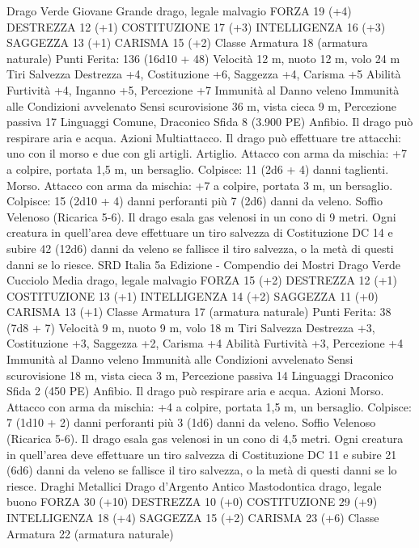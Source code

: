 \begin{multicols}{2}
Drago Verde Giovane
Grande drago, legale malvagio
FORZA 19 (+4)
DESTREZZA 12 (+1)
COSTITUZIONE 17 (+3)
INTELLIGENZA 16 (+3)
SAGGEZZA 13 (+1)
CARISMA 15 (+2)
Classe Armatura 18 (armatura naturale)
\hspace*{0pt}\hfill{Punti Ferita}: 136 (16d10 + 48)
Velocità 12 m, nuoto 12 m, volo 24 m
Tiri Salvezza Destrezza +4, Costituzione +6, Saggezza +4, Carisma +5
Abilità Furtività +4, Inganno +5, Percezione +7
Immunità al Danno veleno
Immunità alle Condizioni avvelenato
Sensi scurovisione 36 m, vista cieca 9 m, Percezione passiva 17
Linguaggi Comune, Draconico
Sfida 8 (3.900 PE)
Anfibio. Il drago può respirare aria e acqua.
Azioni
Multiattacco. Il drago può effettuare tre attacchi: uno con il
morso e due con gli artigli.
Artiglio. Attacco con arma da mischia: +7 a colpire, portata 1,5
m, un bersaglio.
Colpisce: 11 (2d6 + 4) danni taglienti.
Morso. Attacco con arma da mischia: +7 a colpire, portata 3 m,
un bersaglio.
Colpisce: 15 (2d10 + 4) danni perforanti più 7 (2d6) danni da veleno.
Soffio Velenoso (Ricarica 5-6). Il drago esala gas velenosi in un
cono di 9 metri. Ogni creatura in quell’area deve effettuare un tiro
salvezza di Costituzione DC 14 e subire 42 (12d6) danni da veleno se
fallisce il tiro salvezza, o la metà di questi danni se lo riesce.
SRD Italia 5a Edizione - Compendio dei Mostri
Drago Verde Cucciolo
Media drago, legale malvagio
FORZA 15 (+2)
DESTREZZA 12 (+1)
COSTITUZIONE 13 (+1)
INTELLIGENZA 14 (+2)
SAGGEZZA 11 (+0)
CARISMA 13 (+1)
Classe Armatura 17 (armatura naturale)
\hspace*{0pt}\hfill{Punti Ferita}: 38 (7d8 + 7)
Velocità 9 m, nuoto 9 m, volo 18 m
Tiri Salvezza Destrezza +3, Costituzione +3, Saggezza +2,
Carisma +4
Abilità Furtività +3, Percezione +4
Immunità al Danno veleno
Immunità alle Condizioni avvelenato
Sensi scurovisione 18 m, vista cieca 3 m, Percezione passiva 14
Linguaggi Draconico
Sfida 2 (450 PE)
Anfibio. Il drago può respirare aria e acqua.
Azioni
Morso. Attacco con arma da mischia: +4 a colpire, portata 1,5
m, un bersaglio.
Colpisce: 7 (1d10 + 2) danni perforanti più 3 (1d6) danni da veleno.
Soffio Velenoso (Ricarica 5-6). Il drago esala gas velenosi in un
cono di 4,5 metri. Ogni creatura in quell’area deve effettuare un tiro
salvezza di Costituzione DC 11 e subire 21 (6d6) danni da veleno se
fallisce il tiro salvezza, o la metà di questi danni se lo riesce.
Draghi Metallici
Drago d’Argento Antico
Mastodontica drago, legale buono
FORZA 30 (+10)
DESTREZZA 10 (+0)
COSTITUZIONE 29 (+9)
INTELLIGENZA 18 (+4)
SAGGEZZA 15 (+2)
CARISMA 23 (+6)
Classe Armatura 22 (armatura naturale)

\end{multicols}
